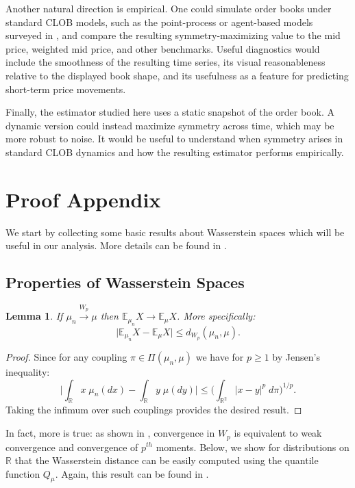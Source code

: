 \documentclass[11pt]{article}
\theoremstyle{plain}
\newtheorem{lemma}[theorem]{Lemma}
\theoremstyle{definition}
\numberwithin{equation}{section}
\newcommand{\R}{\mathbb{R}}
\newcommand{\E}{\mathbb{E}}
\begin{document}
Another natural direction is empirical. One could simulate order books under
standard CLOB models, such as the point-process or agent-based models surveyed
in \cite{jain2024_limit_order_book_simulations_review}, and compare the resulting
symmetry-maximizing value to the mid price, weighted mid price, and other
benchmarks. Useful diagnostics would include the smoothness of the resulting
time series, its visual reasonableness relative to the displayed book shape, and
its usefulness as a feature for predicting short-term price movements.

Finally, the estimator studied here uses a static snapshot of the order book. A
dynamic version could instead maximize symmetry across time, which may be more
robust to noise. It would be useful to understand when symmetry arises in
standard CLOB dynamics and how the resulting estimator performs empirically.

\newpage
\appendix
\section{Proof Appendix}

We start by collecting some basic results about Wasserstein spaces which will be useful
in our analysis. More details can be found in \cite{panaretos2020_statistics_wasserstein_space}.

\subsection{Properties of Wasserstein Spaces}

\begin{lemma}
    If $\mu_n \xrightarrow{W_p} \mu$ then $\E_{\mu_n} X \to \E_\mu X$. More specifically:
%
    \[\Big| \E_{\mu_n} X - \E_\mu X \Big| \leq d_{W_p}(\mu_n, \mu).\]
%
    \label{lem:conv_Wp_implies_means_conv}
\end{lemma}
\begin{proof}
    \noindent Since for any coupling $\pi \in \Pi(\mu_n, \mu)$ we have for $p \geq 1$ by Jensen's inequality:
        \[\bigg|\int_\R x \; \mu_n(dx) - \int_\R y \; \mu(dy) \bigg| \leq \bigg(\int_{\R^2} |x - y|^p \; d\pi \bigg)^{1/p}. \]
    \noindent Taking the infimum over such couplings provides the desired result.
\end{proof}

In fact, more is true: as shown in \cite{panaretos2020_statistics_wasserstein_space}, convergence in $W_p$ is equivalent
 to weak convergence and convergence of $p^{th}$ moments. Below, we show for distributions on $\R$
 that the Wasserstein distance can be easily computed using the quantile function $Q_\mu$. Again, this result
 can be found in \cite{panaretos2020_statistics_wasserstein_space}.
\end{document}
